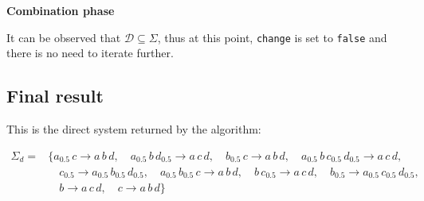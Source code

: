 \documentclass[
  letterpaper,
  DIV=11,
  numbers=noendperiod]{scrartcl}
\begin{document}
\textbf{Combination phase}

It can be observed that \(\mathcal D \subseteq \Sigma\), thus at this
point, \texttt{change} is set to \texttt{false} and there is no need to
iterate further.

\subsection{Final result}\label{final-result}

This is the direct system returned by the algorithm:

\begin{align*}
\Sigma_d = & \big\{a_{0.5}\,c \to a\,b\,d,\quad a_{0.5}\,b\,d_{0.5} \to a\,c\,d,\quad b_{0.5}\,c \to a\,b\,d,\quad a_{0.5}\,b\,c_{0.5}\,d_{0.5} \to a\,c\,d,\\
&\quad c_{0.5} \to a_{0.5}\,b_{0.5}\,d_{0.5},\quad a_{0.5}\,b_{0.5}\,c \to a\,b\,d,\quad b\,c_{0.5} \to a\,c\,d,\quad b_{0.5} \to a_{0.5}\,c_{0.5}\,d_{0.5}, \\
&\quad b \to a\,c\,d,\quad c \to a\,b\,d\big\}
\end{align*}
\end{document}
